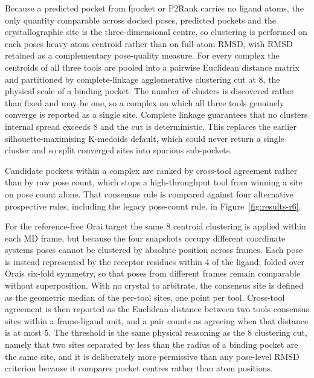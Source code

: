 Because a predicted pocket from fpocket or P2Rank carries no ligand atoms, the only quantity comparable across docked poses, predicted pockets and the crystallographic site is the three-dimensional centre, so clustering is performed on each pose\textquotesingle s heavy-atom centroid rather than on full-atom RMSD, with RMSD retained as a complementary pose-quality measure. For every complex the centroids of all three tools are pooled into a pairwise Euclidean distance matrix and partitioned by complete-linkage agglomerative clustering cut at 8\angstrom{}, the physical scale of a binding pocket. The number of clusters is discovered rather than fixed and may be one, so a complex on which all three tools genuinely converge is reported as a single site. Complete linkage guarantees that no cluster\textquotesingle s internal spread exceeds 8\angstrom{} and the cut is deterministic. This replaces the earlier silhouette-maximising K-medoids default, which could never return a single cluster and so split converged sites into spurious sub-pockets.

Candidate pockets within a complex are ranked by cross-tool agreement rather than by raw pose count, which stops a high-throughput tool from winning a site on pose count alone. That consensus rule is compared against four alternative prospective rules, including the legacy pose-count rule, in Figure~\ref{fig:results-r6}.

For the reference-free Orai target the same 8\angstrom{} centroid clustering is applied within each MD frame, but because the four snapshots occupy different coordinate systems poses cannot be clustered by absolute position across frames. Each pose is instead represented by the receptor residues within 4\angstrom{} of the ligand, folded over Orai\textquotesingle s six-fold symmetry, so that poses from different frames remain comparable without superposition. With no crystal to arbitrate, the consensus site is defined as the geometric median of the per-tool sites, one point per tool. Cross-tool agreement is then reported as the Euclidean distance between two tools\textquotesingle{} consensus sites within a frame-ligand unit, and a pair counts as agreeing when that distance is at most 5\angstrom{}. The threshold is the same physical reasoning as the 8\angstrom{} clustering cut, namely that two sites separated by less than the radius of a binding pocket are the same site, and it is deliberately more permissive than any pose-level RMSD criterion because it compares pocket centres rather than atom positions.

